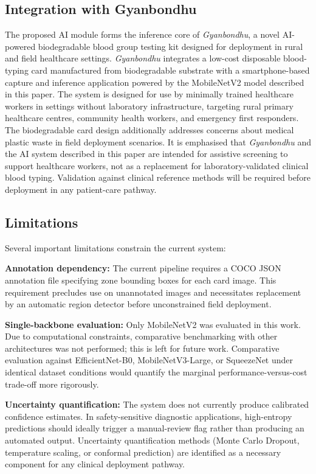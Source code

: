 \documentclass[journal]{IEEEtran}
\begin{document}
\subsection{Integration with Gyanbondhu}

The proposed AI module forms the inference core of
\emph{Gyanbondhu}, a novel AI-powered biodegradable blood group
testing kit designed for deployment in rural and field healthcare
settings.
\emph{Gyanbondhu} integrates a low-cost disposable blood-typing card
manufactured from biodegradable substrate with a smartphone-based
capture and inference application powered by the MobileNetV2 model
described in this paper.
The system is designed for use by minimally trained healthcare
workers in settings without laboratory infrastructure, targeting
rural primary healthcare centres, community health workers, and
emergency first responders.
The biodegradable card design additionally addresses concerns about
medical plastic waste in field deployment scenarios.
It is emphasised that \emph{Gyanbondhu} and the AI system described
in this paper are intended for assistive screening to support
healthcare workers, not as a replacement for laboratory-validated
clinical blood typing.
Validation against clinical reference methods will be required
before deployment in any patient-care pathway.

\subsection{Limitations}

Several important limitations constrain the current system:

\textbf{Annotation dependency:} The current pipeline requires a
COCO JSON annotation file specifying zone bounding boxes for each
card image.
This requirement precludes use on unannotated images and necessitates
replacement by an automatic region detector before unconstrained
field deployment.

\textbf{Single-backbone evaluation:} Only MobileNetV2 was evaluated
in this work.
Due to computational constraints, comparative benchmarking with
other architectures was not performed; this is left for future work.
Comparative evaluation against EfficientNet-B0, MobileNetV3-Large,
or SqueezeNet under identical dataset conditions would quantify
the marginal performance-versus-cost trade-off more rigorously.

\textbf{Uncertainty quantification:} The system does not currently
produce calibrated confidence estimates.
In safety-sensitive diagnostic applications, high-entropy predictions
should ideally trigger a manual-review flag rather than producing
an automated output.
Uncertainty quantification methods (Monte Carlo Dropout, temperature
scaling, or conformal prediction) are identified as a necessary
component for any clinical deployment pathway.
\end{document}
